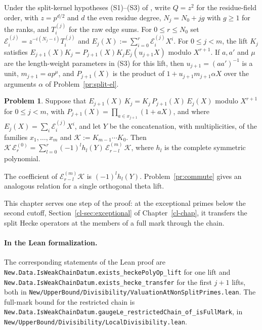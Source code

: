 \documentclass[reqno]{amsart}
\newcounter{chap}
\theoremstyle{definition}
\newtheorem{problem}{Problem}[section]
\theoremstyle{plain}
\begin{document}
Under the split-kernel hypotheses (S1)--(S3) of \cite[\S\S10.3--10.4]{Adr}, write \(Q=z^2\) for the residue-field order, with \(z=p^{d/2}\) and \(d\) the even residue degree, \(N_j=N_0+jg\) with \(g\ge1\) for the ranks, and \(T^{(j)}_i\) for the raw edge sums.  For \(0\le r\le N_0\) set \(\mathcal E^{(j)}_i=z^{-i(N_j-i)}T^{(j)}_i\) and \(E_j(X):=\sum_{i=0}^{r}\mathcal E^{(j)}_i X^i\).  For \(0\le j<m\), the lift \(K_j\) satisfies \(E_{j+1}(X)K_j=P_{j+1}(X)K_jE_j(u_{j+1}X)\) modulo \(X^{r+1}\).  If \(a,a'\) and \(\mu\) are the length-weight parameters in (S3) for this lift, then \(u_{j+1}=(aa')^{-1}\) is a unit, \(m_{j+1}=ap^\mu\), and \(P_{j+1}(X)\) is the product of \(1+u_{j+1}m_{j+1}\alpha X\) over the arguments \(\alpha\) of Problem~\ref{pr:split-el}.

\begin{problem}\label{pr:split-chain}
Suppose that \(E_{j+1}(X)\,K_j = K_j\, P_{j+1}(X)\, E_j(X)\) modulo \(X^{r+1}\) for \(0 \le j < m\), with \(P_{j+1}(X) = \prod_{a \in x_{j+1}}(1 + aX)\), and where \(E_j(X) = \sum_i \mathcal E^{(j)}_i X^i\), and let \(Y\) be the concatenation, with multiplicities, of the families \(x_1, \dots, x_m\) and \(\mathcal K := K_{m-1}\cdots K_0\).  Then
\(\mathcal K\, \mathcal E^{(0)}_r = \sum_{l=0}^r (-1)^l h_l(Y)\, \mathcal E^{(m)}_{r-l}\, \mathcal K\),
where \(h_l\) is the complete symmetric polynomial.
\end{problem}

The coefficient of \(\mathcal E^{(m)}_{r-l}\mathcal K\) is \((-1)^lh_l(Y)\).  Problem~\ref{pr:commute} gives an analogous relation for a single orthogonal theta lift.

This chapter serves one step of the proof: at the exceptional primes below the second cutoff, Section~\ref{cl-sec:exceptional} of Chapter~\ref{cl-chap}, it transfers the split Hecke operators at the members of a full mark through the chain.

\paragraph{In the Lean formalization.}
The corresponding statements of the Lean proof \cite{GL} are \texttt{New.Data.IsWeakChainDatum.exists\_heckePolyOp\_lift} for one lift and \texttt{New.Data.IsWeakChainDatum.exists\_hecke\_transfer} for the first \(j+1\) lifts, both in \texttt{New/UpperBound/Divisibility/ValuationAtNonSplitPrimes.lean}.  The full-mark bound for the restricted chain is \texttt{New.Data.IsWeakChainDatum.gaugeLe\_restrictedChain\_of\_isFullMark}, in \texttt{New/UpperBound/Divisibility/LocalDivisibility.lean}.
\end{document}
